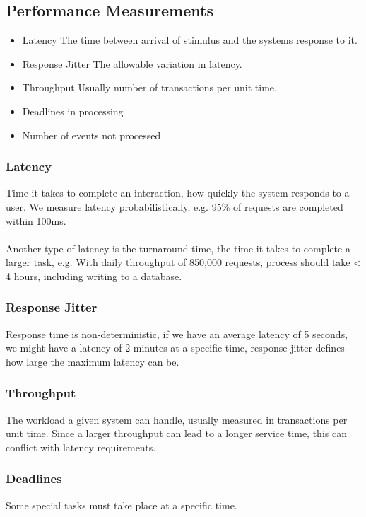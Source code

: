 \subsection{Performance Measurements}
\begin{itemize}
	\item Latency
	      \subitem The time between arrival of stimulus and the systems response to it.
	\item Response Jitter
	      \subitem The allowable variation in latency.
	\item Throughput
	      \subitem Usually number of transactions per unit time.
	\item Deadlines in processing
	\item Number of events not processed
\end{itemize}
\subsubsection{Latency}
Time it takes to complete an interaction, how quickly the system responds to a user. We measure latency probabilistically, e.g. 95\% of requests are completed within 100ms.\\
\\
Another type of latency is the turnaround time, the time it takes to complete a larger task, e.g. With daily throughput of 850,000 requests, process should take < 4 hours, including writing to a database.

\subsubsection{Response Jitter}
Response time is non-deterministic, if we have an average latency of 5 seconds, we might have a latency of 2 minutes at a specific time, response jitter defines how large the maximum latency can be.

\subsubsection{Throughput}
The workload a given system can handle, usually measured in transactions per unit time. Since a larger throughput can lead to a longer service time, this can conflict with latency requirements.

\subsubsection{Deadlines}
Some special tasks must take place at a specific time.

